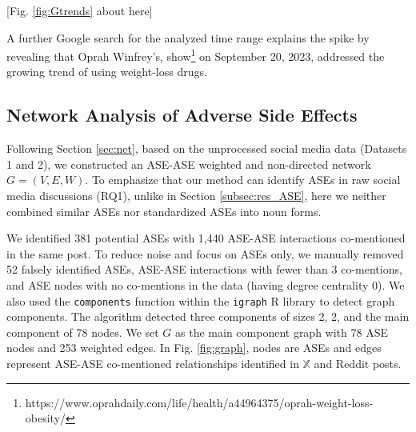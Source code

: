 \documentclass[referee,bst/sn-basic]{sn-jnl}%
\theoremstyle{thmstyletwo}%
\theoremstyle{thmstylethree}%
\begin{document}
\begin{center}
    [Fig. \ref{fig:Gtrends} about here]
\end{center}

\begin{comment}

\begin{figure}
    \centering
    \texttt{[image: images/GoogleTrends.pdf]}
    \caption{Google Trends queries for GLP-1 RAs on our \textit{Medication List}.
        } 
    \label{fig:Gtrends}
    \begin{tikzpicture}[remember picture,overlay]
        \draw[black, thick, dashed] (1.95, 3.0) -- (1.95, 8.6); %
    \end{tikzpicture}
\end{figure} 

\end{comment}

A further Google search for the analyzed time range explains the spike by revealing that Oprah Winfrey's, show\footnote{https://www.oprahdaily.com/life/health/a44964375/oprah-weight-loss-obesity/} on September 20, 2023, addressed the growing trend of using weight-loss drugs. 


\subsection{Network Analysis of Adverse Side Effects}
\label{subsec:ASE_net}
Following Section \ref{sec:net}, based on the unprocessed social media data (Datasets 1 and 2), we constructed an ASE-ASE weighted and non-directed network $G=(V,E,W)$.
To emphasize that our method can identify ASEs in raw social media discussions (RQ1), unlike in Section \ref{subsec:res_ASE}, here we neither combined similar ASEs nor standardized ASEs into noun forms.

We identified 381 potential ASEs with 1,440 ASE-ASE interactions co-mentioned in the same post. 
To reduce noise and focus on ASEs only, we manually removed 52 falsely identified ASEs, ASE-ASE interactions with fewer than 3 co-mentions, and ASE nodes with no co-mentions in the data (having degree centrality 0). 
We also used the \texttt{components} function within the \texttt{igraph} R library \cite{csardi2013package} to detect graph components.
The algorithm detected three components of sizes 2, 2, and the main component of 78 nodes.
We set $G$ as the main component graph with 78 ASE nodes and 253 weighted edges.
In Fig. \ref{fig:graph}, nodes are ASEs and edges represent ASE-ASE co-mentioned relationships identified in $\mathbb{X}$ and Reddit posts.  
\end{document}
